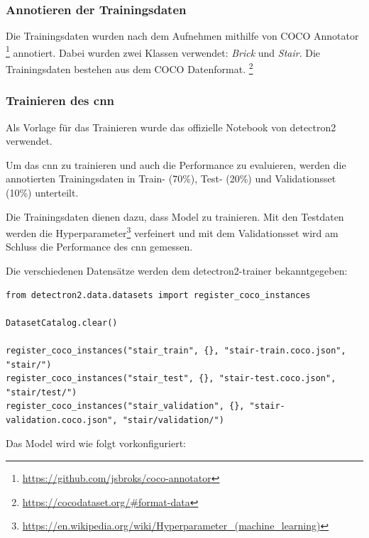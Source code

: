 \subsubsection{Annotieren der Trainingsdaten}

Die Trainingsdaten wurden nach dem Aufnehmen mithilfe von COCO Annotator \footnote{\url{https://github.com/jsbroks/coco-annotator}} annotiert.
Dabei wurden zwei Klassen verwendet: {\it Brick} und {\it Stair}. Die Trainingsdaten bestehen aus dem COCO Datenformat. \footnote{\url{https://cocodataset.org/\#format-data}}


\newpage

\subsubsection{Trainieren des \acrshort{cnn}}

Als Vorlage für das Trainieren wurde das offizielle Notebook von detectron2 verwendet. \cite{detectron2-colab}

Um das \acrshort{cnn} zu trainieren und auch die Performance zu evaluieren, werden die annotierten Trainingsdaten
in Train- (70\%), Test- (20\%) und Validationsset (10\%) unterteilt.

Die Trainingsdaten dienen dazu, dass Model zu trainieren. Mit den Testdaten werden die Hyperparameter\footnote{\url{https://en.wikipedia.org/wiki/Hyperparameter_(machine_learning)}} verfeinert und
mit dem Validationsset wird am Schluss die Performance des \acrshort{cnn} gemessen.

Die verschiedenen Datensätze werden dem detectron2-trainer bekanntgegeben:

\begin{verbatim}
from detectron2.data.datasets import register_coco_instances

DatasetCatalog.clear()

register_coco_instances("stair_train", {}, "stair-train.coco.json", "stair/")
register_coco_instances("stair_test", {}, "stair-test.coco.json", "stair/test/")
register_coco_instances("stair_validation", {}, "stair-validation.coco.json", "stair/validation/")
\end{verbatim}

Das Model wird wie folgt vorkonfiguriert:

